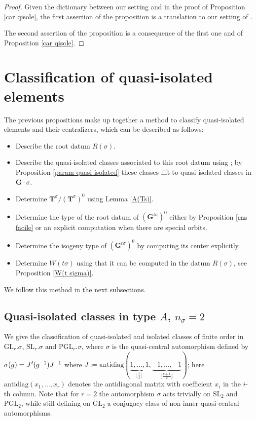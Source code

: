 \documentclass{amsart}
\numberwithin{equation}{section}
\theoremstyle{definition}
\theoremstyle{remark}
\newcommand\bG{{\mathbf G}}
\newcommand\bT{{\mathbf T}}
\newcommand\Gtso{{(\bG^{t\sigma})^0}}
\newcommand\Tso{{(\bT^\sigma)^0}}
\newcommand\Ts{{\bT^\sigma}}
\newcommand\lexp[2]{\kern\scriptspace\vphantom{#2}^{#1}\kern-\scriptspace#2}
\newcommand\inv{^{-1}}
\newcommand\GL{\mathrm{GL}}
\newcommand\SL{\mathrm{SL}}
\newcommand\PGL{\mathrm{PGL}}
\newcommand\antidiag{\mathrm{antidiag}}
\begin{document}
\begin{proof}
Given the dictionary between our setting and \cite{cedric} in the proof of
Proposition \ref{car qisole}, the first
assertion of the proposition is a translation to our setting of 
\cite[4.B]{cedric}. 

The second assertion of the proposition is a consequence of the first one
and of Proposition \ref{car qisole}.
\end{proof}

\section{Classification of quasi-isolated elements}
The previous propositions make up together
a method to classify quasi-isolated elements and their centralizers,
which can be described as follows:
\begin{itemize}
\item Describe the root datum $R(\sigma)$.
\item Describe the quasi-isolated classes associated to this root datum using
\cite{cedric}; by Proposition \ref{param quasi-isolated} these classes lift to
quasi-isolated classes in $\bG\cdot\sigma$.
\item Determine $\Ts/\Tso$ using Lemma \ref{A(Ts)}.
\item Determine the type of the root datum of $\Gtso$ either by Proposition \ref{cas
facile} or an explicit computation when there are special orbits.
\item Determine the isogeny type of $\Gtso$ by computing its center
explicitly.
\item Determine $W(t\sigma)$ using that it can be computed in the datum
$R(\sigma)$, see Proposition \ref{W(t sigma)}.
\end{itemize}
We follow this method in the next subsections.
\subsection*{Quasi-isolated classes in type $A$, $n_\sigma=2$} 
We  give  the  classification  of  quasi-isolated  and  isolated
classes   of   finite   order   in   $\GL_r.\sigma$,   $\SL_r.\sigma$   and
$\PGL_r.\sigma$, where $\sigma$ is the quasi-central automorphism defined by
$\sigma(g)= J\lexp t(g\inv)J\inv$ where 
$J:=\antidiag(\underbrace{1,\ldots,1}_{\lfloor\frac r 2\rfloor},
\underbrace{-1,\ldots,-1}_{\lfloor\frac {r+1} 2\rfloor})$;
here $\antidiag(x_1,\ldots,x_r)$ denotes the antidiagonal matrix with 
coefficient $x_i$ in the $i$-th column.
Note that for $r=2$ the automorphism $\sigma$ acts trivially on
$\SL_2$ and $\PGL_2$, while still defining on $\GL_2$ a conjugacy class of
non-inner quasi-central automorphisms.
\end{document}

